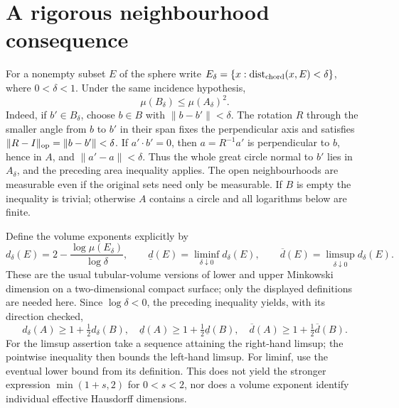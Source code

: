 \documentclass[11pt]{article}
\begin{document}
\section{A rigorous neighbourhood consequence}
For a nonempty subset $E$ of the sphere write
$E_\delta=\{x:\operatorname{dist}_{\rm chord}(x,E)<\delta\}$,
where $0<\delta<1$. Under the same incidence hypothesis,
\[
 \mu(B_\delta)\le\mu(A_\delta)^2.
\]
Indeed, if $b'\in B_\delta$, choose $b\in B$ with
$\|b-b'\|<\delta$. The rotation $R$ through the smaller angle
from $b$ to $b'$ in their span fixes the perpendicular axis and
satisfies $\|R-I\|_{\rm op}=\|b-b'\|<\delta$. If $a'\cdot b'=0$,
then $a=R^{-1}a'$ is perpendicular to $b$, hence in $A$, and
$\|a'-a\|<\delta$. Thus the whole great circle normal to $b'$
lies in $A_\delta$, and the preceding area inequality applies.
The open neighbourhoods are measurable even if the original sets
need only be measurable. If $B$ is empty the inequality is trivial;
otherwise $A$ contains a circle and all logarithms below are finite.

Define the volume exponents explicitly by
\[
 d_\delta(E)=2-\frac{\log\mu(E_\delta)}{\log\delta},
 \qquad \underline d(E)=\liminf_{\delta\downarrow0}d_\delta(E),
 \qquad \overline d(E)=\limsup_{\delta\downarrow0}d_\delta(E).
\]
These are the usual tubular-volume versions of lower and upper
Minkowski dimension on a two-dimensional compact surface; only
the displayed definitions are needed here. Since $\log\delta<0$,
the preceding inequality yields, with its direction checked,
\[
 d_\delta(A)\ge1+\tfrac12d_\delta(B),\quad
 \underline d(A)\ge1+\tfrac12\underline d(B),\quad
 \overline d(A)\ge1+\tfrac12\overline d(B).
\]
For the limsup assertion take a sequence attaining the right-hand
limsup; the pointwise inequality then bounds the left-hand limsup.
For liminf, use the eventual lower bound from its definition.
This does not yield the stronger expression $\min(1+s,2)$ for
$0<s<2$, nor does a volume exponent identify individual effective
Hausdorff dimensions.
\end{document}
